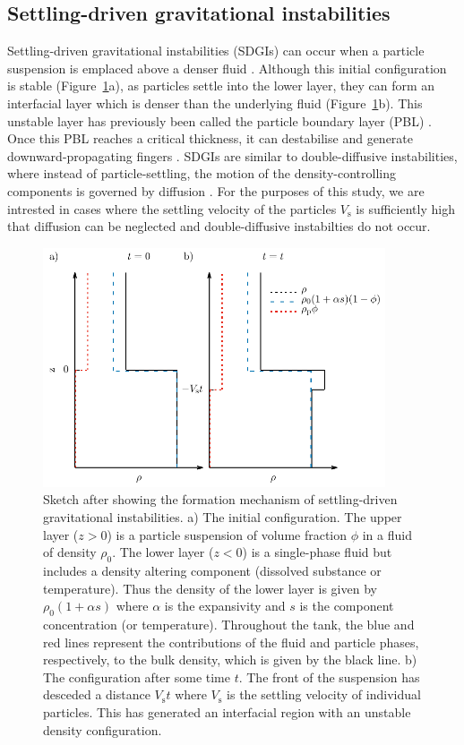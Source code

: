 \documentclass[authoryear,preprint,review,12pt]{elsarticle}
\begin{document}
\subsection{Settling-driven gravitational instabilities}
\label{subsec:SDGI}

Settling-driven gravitational instabilities (SDGIs) can occur when a particle suspension is emplaced above a denser fluid \citep{Hoyal99, Blanchette05}. Although this initial configuration is stable (Figure~\ref{fig:dens_prof}a), as particles settle into the lower layer, they can form an interfacial layer which is denser than the underlying fluid (Figure~\ref{fig:dens_prof}b). This unstable layer has previously been called the particle boundary layer (PBL) \citep{Carrazo12}. Once this PBL reaches a critical thickness, it can destabilise and generate downward-propagating fingers \citep{Hoyal99}. SDGIs are similar to double-diffusive instabilities, where instead of particle-settling, the motion of the density-controlling components is governed by diffusion \citep{Stern60}. For the purposes of this study, we are intrested in cases where the settling velocity of the particles $V_{\text{s}}$ is sufficiently high that diffusion can be neglected and double-diffusive instabilties do not occur.

\begin{figure}[ht!]
  \centerline{\includegraphics[width=0.9\textwidth]{dens_prof.pdf}}
  \caption{Sketch after \citet{Burns12} showing the formation mechanism of settling-driven gravitational instabilities. a) The initial configuration. The upper layer ($z > 0$) is a particle suspension of volume fraction $\phi$ in a fluid of density $\rho_{0}$. The lower layer ($z < 0$) is a single-phase fluid but includes a density altering component (dissolved substance or temperature). Thus the density of the lower layer is given by $\rho_{0}(1 + \alpha s)$ where $\alpha$ is the expansivity and $s$ is the component concentration (or temperature). Throughout the tank, the blue and red lines represent the contributions of the fluid and particle phases, respectively, to the bulk density, which is given by the black line. b) The configuration after some time $t$. The front of the suspension has desceded a distance $V_{\text{s}} t$ where $V_{\text{s}}$ is the settling velocity of individual particles. This has generated an interfacial region with an unstable density configuration.}
  \label{fig:dens_prof}
\end{figure}
\end{document}
